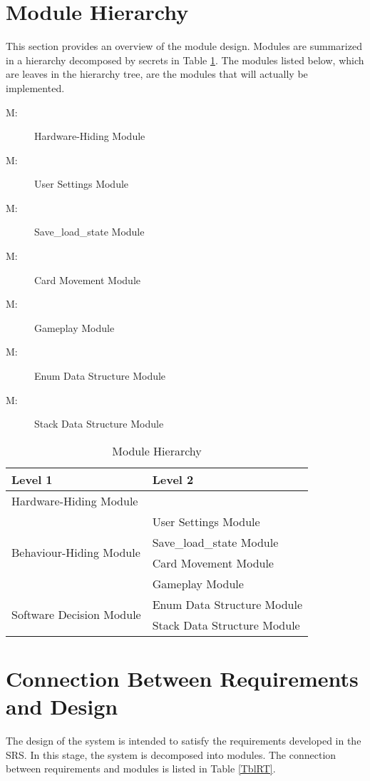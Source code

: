 \documentclass[12pt, titlepage]{article}
\newcounter{mnum}
\newcommand{\mthemnum}{M\themnum}
\begin{document}
	\section{Module Hierarchy} \label{SecMH}
	This section provides an overview of the module design. Modules are 
	summarized in a hierarchy decomposed by secrets in Table \ref{TblMH}. The 
	modules listed below, which are leaves in the hierarchy tree, are the 
	modules that will actually be implemented.
	\begin{description}
		\item [ \mthemnum \label{mHH}:] Hardware-Hiding 
		Module
		\item [ \mthemnum \label{mUS}:] User Settings 
		Module
		\item [ \mthemnum \label{mSL}:] Save\_load\_state 
		Module
		\item [ \mthemnum \label{mCM}:] Card Movement 
		Module
		\item [ \mthemnum \label{mGP}:] Gameplay Module
		\item [ \mthemnum \label{mEnum}:] Enum Data 
		Structure Module
		\item [ \mthemnum \label{mStack}:] Stack Data 
		Structure Module
	\end{description}
	\begin{table}[h!]
		\centering
		\begin{tabular}{p{} p{}}
			\toprule
			\textbf{Level 1} & \textbf{Level 2}\\
			\midrule
			{Hardware-Hiding Module} & ~ \\
			\midrule
			\multirow{4}{0.3\textwidth}{Behaviour-Hiding Module}
			& User Settings Module\\
			& Save\_load\_state Module\\
			& Card Movement Module\\
			& Gameplay Module\\
			\midrule
			\multirow{2}{0.3\textwidth}{Software Decision Module}
			& Enum Data Structure Module\\
			& Stack Data Structure Module\\
			\bottomrule
		\end{tabular}
		\caption{Module Hierarchy}
		\label{TblMH}
	\end{table}
	\section{Connection Between Requirements and Design} \label{SecConnection}
	The design of the system is intended to satisfy the requirements developed 
	in the SRS. In this stage, the system is decomposed into modules. The 
	connection between requirements and modules is listed in Table \ref{TblRT}.
\end{document}
